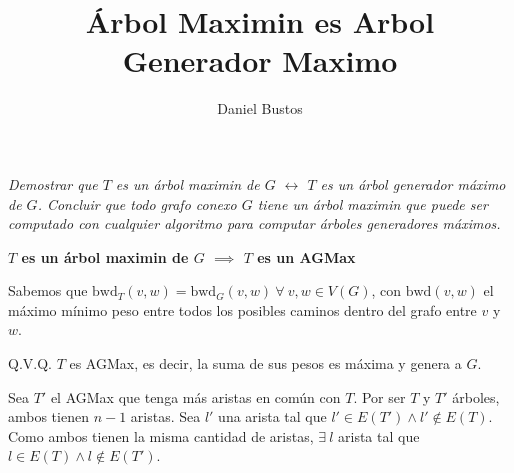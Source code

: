 \documentclass{article}
\title{Árbol Maximin es Arbol Generador Maximo}
\author{Daniel Bustos}
\begin{document}
\maketitle

\textit{Demostrar que \(T\) es un árbol maximin de \(G\) $\leftrightarrow$ \(T\) es un árbol
generador máximo de \(G\). Concluir que todo grafo conexo \(G\) tiene un árbol maximin que puede
ser computado con cualquier algoritmo para computar árboles generadores máximos.}

\textbf{\(T\) es un árbol maximin de \(G\) \(\implies\) \(T\) es un AGMax}

Sabemos que \( \text{bwd}_T(v,w) = \text{bwd}_G(v,w) \ \forall \ v,w \in V(G)\), con \(\text{bwd}(v,w)\) el máximo mínimo peso entre todos los posibles caminos dentro del grafo entre \(v\) y \(w\).

Q.V.Q. \(T\) es AGMax, es decir, la suma de sus pesos es máxima y genera a \(G\).

Sea \(T'\) el AGMax que tenga más aristas en común con \(T\). Por ser \(T\) y \(T'\) árboles, ambos tienen \(n-1\) aristas. Sea \(l'\) una arista tal que \(l' \in E(T') \land l' \notin E(T)\). Como ambos tienen la misma cantidad de aristas, 
\(\exists \ l\) arista tal que \(l \in E(T) \land l \notin E(T')\).
\end{document}

